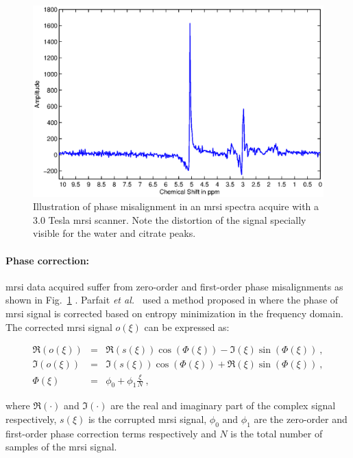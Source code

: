 
\begin{figure}
	\centering
	\includegraphics[width=0.7\linewidth]{3_review/figures/processing/pre-processing/phase/phase.eps}
	\caption[Illustration of phase malignant in an \ac{mrsi} spectra.]{Illustration of phase misalignment in an \ac{mrsi} spectra acquire with a 3.0 Tesla \ac{mrsi} scanner. Note the distortion of the signal specially visible for the water and citrate peaks.}
	\label{fig:phase}
\end{figure}

\paragraph{Phase correction:} \ac{mrsi} data acquired suffer from zero-order and first-order phase misalignments as shown in Fig.~\ref{fig:phase} \cite{Chen2002,Osorio-Garcia2012}. 
Parfait \textit{et al.}~\cite{Parfait2012} used a method proposed in \cite{Chen2002} where the phase of \ac{mrsi} signal is corrected based on entropy minimization in the frequency domain.
The corrected \ac{mrsi} signal $o(\xi)$ can be expressed as:

\begin{eqnarray}
	\Re(o(\xi)) & = & \Re(s(\xi))\cos(\Phi(\xi)) - \Im(\xi)\sin(\Phi(\xi)) \ , \nonumber  \\
	\Im(o(\xi)) & = & \Im(s(\xi))\cos(\Phi(\xi)) + \Re(\xi)\sin(\Phi(\xi)) \ , \nonumber \\
	\Phi(\xi) & = & \phi_0 + \phi_1 \frac{\xi}{N} \ , \label{eq:mrsiphcorr}
\end{eqnarray}

\noindent where $\Re(\cdot)$ and $\Im(\cdot)$ are the real and imaginary part of the complex signal respectively, $s(\xi)$ is the corrupted \ac{mrsi} signal, $\phi_0$ and $\phi_1$ are the zero-order and first-order phase correction terms respectively and $N$ is the total number of samples of the \ac{mrsi} signal.


